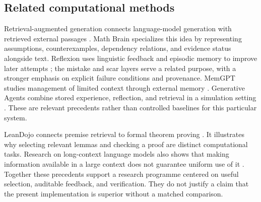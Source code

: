 \subsection{Related computational methods}

Retrieval-augmented generation connects language-model generation with retrieved external passages \citep{rag2020}. Math Brain specializes this idea by representing assumptions, counterexamples, dependency relations, and evidence status alongside text. Reflexion uses linguistic feedback and episodic memory to improve later attempts \citep{reflexion2023}; the mistake and scar layers serve a related purpose, with a stronger emphasis on explicit failure conditions and provenance. MemGPT studies management of limited context through external memory \citep{memgpt2023}. Generative Agents combine stored experience, reflection, and retrieval in a simulation setting \citep{generative2023}. These are relevant precedents rather than controlled baselines for this particular system.

LeanDojo connects premise retrieval to formal theorem proving \citep{leandojo2023}. It illustrates why selecting relevant lemmas and checking a proof are distinct computational tasks. Research on long-context language models also shows that making information available in a large context does not guarantee uniform use of it \citep{lostmiddle2024}. Together these precedents support a research programme centered on useful selection, auditable feedback, and verification. They do not justify a claim that the present implementation is superior without a matched comparison.
